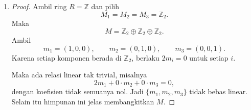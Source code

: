 \documentclass[11pt,a4paper]{article}
\begin{document}
\begin{enumerate}
  \item      \begin{proof}
          Ambil ring $R=\mathbb{Z}$ dan pilih
          \[
            M_1 = M_2 = M_3 = \mathbb{Z}_2.
          \]
          Maka
          \[
            M = \mathbb{Z}_2 \oplus \mathbb{Z}_2 \oplus \mathbb{Z}_2.
          \]
          Ambil
          \[
            m_1=(1,0,0), \qquad m_2=(0,1,0), \qquad m_3=(0,0,1).
          \]
          Karena setiap komponen berada di $\mathbb{Z}_2$, berlaku $2m_i=0$ untuk setiap $i$.

          Maka ada relasi linear tak trivial, misalnya
          \[
            2m_1 + 0\cdot m_2 + 0\cdot m_3 = 0,
          \]
          dengan koefisien tidak semuanya nol. Jadi $\{m_1,m_2,m_3\}$ tidak bebas linear. Selain itu himpunan ini jelas membangkitkan $M$.
        \end{proof}
\end{enumerate}
\end{document}
